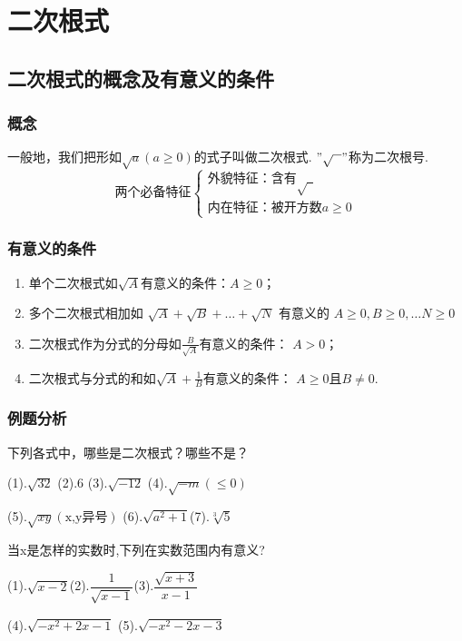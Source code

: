 \chapter{二次根式}
\section{二次根式的概念及有意义的条件}
\subsection{概念}
一般地，我们把形如$\sqrt{a}(a\geq 0)$的式子叫做二次根式. $"\sqrt{~~}"$称为二次根号.
$$
\text{两个必备特征} \begin{cases}  
\text{外貌特征：含有$\sqrt{~~}$}\\
\text{内在特征：被开方数$a\geq 0$}
\end{cases}
$$
\subsection{有意义的条件}
\begin{enumerate}
    \item 单个二次根式如$\sqrt{A}$有意义的条件：$A\geq 0$；
    \item 多个二次根式相加如 $\sqrt{A}+\sqrt{B}+\ldots+\sqrt{N}$                         有意义的
    $A \geqslant 0,B \geqslant 0 ,\ldots N \geqslant 0$
    \item 二次根式作为分式的分母如$\frac{B}{\sqrt{A}}$有意义的条件： 
    $A>0$；
    \item 二次根式与分式的和如$\sqrt{A}+\frac{1}{B}$有意义的条件：
    $A \geq 0\text{且} B\neq 0$.


\end{enumerate}
\subsection{例题分析}
\begin{example}下列各式中，哪些是二次根式？哪些不是？\par
(1).$\sqrt{32}$ \hfil (2).6 \hfil (3).$\sqrt{-12}$ \hfil (4).$\sqrt{-m}(\leqslant 0)$\par
(5).$\sqrt{xy}(\text{x,y异号})$  \hfil (6).$\sqrt{a^2+1}$\hfil (7).$\sqrt[3]{5}$
\end{example}
\begin{example}
    当x是怎样的实数时,下列在实数范围内有意义?\par
    (1).$\sqrt{x-2}$\hfil (2).$\dfrac{1}{\sqrt{x-1}}$\hfil (3).$\dfrac{\sqrt{x+3}}{x-1}$\par
    \vspace{2cm}
    (4).$\sqrt{-x^{2}+2 x-1}$ \hfil  (5).$\sqrt{-x^{2}-2 x-3}$
\end{example}
\vspace{2cm}
